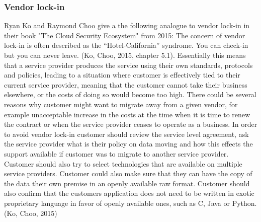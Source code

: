 \documentclass{article}
\begin{document}
\subsubsection{Vendor lock-in}
Ryan Ko and Raymond Choo give a the following analogue to vendor lock-in in their book "The Cloud Security Ecosystem" from 2015: The concern of vendor lock-in is often described as the “Hotel-California” syndrome. You can check-in but you can never leave. (Ko, Choo, 2015, chapter 5.1).
Essentially this means that a service provider produces the service using their own standards, protocols and policies, leading to a situation where customer is effectively tied to their current service provider, meaning that the customer cannot take their business elsewhere, or the costs of doing so would become too high. There could be several reasons why customer might want to migrate away from a given vendor, for example unacceptable increase in the costs at the time when it is time to renew the contract or when the service provider ceases to operate as a business. In order to avoid vendor lock-in customer should review the service level agreement, ask the service provider what is their policy on data moving and how this effects the support available if customer was to migrate to another service provider. Customer should also try to select technologies that are available on multiple service providers. Customer could also make sure that they can have the copy of the data their own premise in an openly available raw format. Customer should also confirm that the customers application does not need to be written in exotic proprietary language in favor of openly available ones, such as C, Java or Python. (Ko, Choo, 2015)
\end{document}
